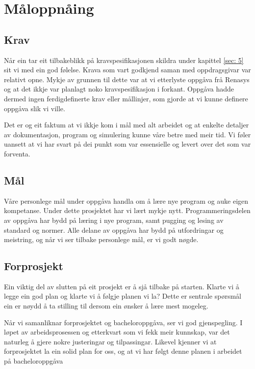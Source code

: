 \section{Måloppnåing}
\thispagestyle{fancy}

\subsection{Krav}
Når ein tar eit tilbakeblikk på kravspesifikasjonen skildra under kapittel \ref{sec: 5} sit vi med ein god følelse.
Krava som vart godkjend saman med oppdragsgivar var relativt opne.
Mykje av grunnen til dette var at vi etterlyste oppgåva frå \gls{Renasys} og at det ikkje var planlagt noko kravspesifikasjon i forkant. \newline
Oppgåva hadde dermed ingen ferdigdefinerte krav eller mållinjer, som gjorde at vi kunne definere oppgåva slik vi ville.

Det er og eit faktum at vi ikkje kom i mål med alt arbeidet og at enkelte detaljer av dokumentasjon, program og simulering
kunne våre betre med meir tid.
Vi føler uansett at vi har svart på dei punkt som var essensielle og levert over det som var forventa.



\subsection{Mål}
Våre personlege mål under oppgåva handla om å lære nye program og auke eigen kompetanse. Under dette prosjektet har vi lært mykje nytt. 
Programmeringsdelen av oppgåva har bydd på læring i nye program, samt pugging og lesing av standard og normer.
Alle delane av oppgåva har bydd på utfordringar og meistring, og når vi ser tilbake personlege mål, er vi godt nøgde.

\subsection{Forprosjekt}
Ein viktig del av slutten på eit prosjekt er å sjå tilbake på starten.
Klarte vi å legge ein god plan og klarte vi å følgje planen vi la?
Dette er sentrale spørsmål ein er nøydd å ta stilling til dersom ein ønsker å lære mest mogeleg.

Når vi samanliknar forprosjektet og bacheloroppgåva, ser vi god gjenspegling. 
I løpet av arbeidsprosessen og etterkvart som vi fekk meir kunnskap, var det naturleg å gjere nokre justeringar og tilpassingar. 
Likevel kjenner vi at forprosjektet la ein solid plan for oss, og at vi har følgt denne planen i arbeidet på bacheloroppgåva



\newpage
